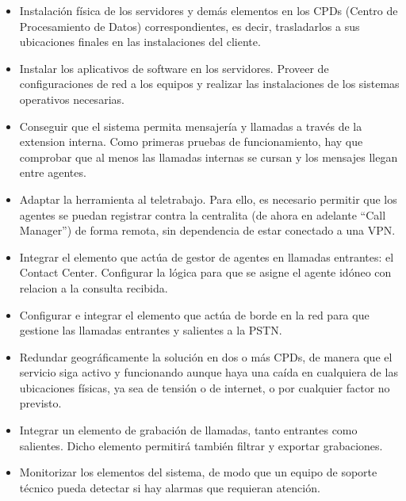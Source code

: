 \documentclass[a4paper, 12pt]{book}
\begin{document}
\begin{itemize}

  \item Instalación física de los servidores y demás elementos en los CPDs (Centro de Procesamiento de Datos) correspondientes, es decir, trasladarlos a sus ubicaciones finales en las instalaciones del cliente.
  
  \item Instalar los aplicativos de software en los servidores. Proveer de configuraciones de red a los equipos y realizar las instalaciones de los sistemas operativos necesarias.

  \item Conseguir que el sistema permita mensajería y llamadas a través de la extension interna. Como primeras pruebas de funcionamiento, hay que comprobar que al menos las llamadas internas se cursan y los mensajes llegan entre agentes.
  
  \item Adaptar la herramienta al teletrabajo. Para ello, es necesario permitir que los agentes se puedan registrar contra la centralita (de ahora en adelante ``Call Manager'') de forma remota, sin dependencia de estar conectado a una VPN.   

  \item Integrar el elemento que actúa de gestor de agentes en llamadas entrantes: el Contact Center. Configurar la lógica para que se asigne el agente idóneo con relacion a la consulta recibida.

  \item Configurar e integrar el elemento que actúa de borde en la red para que gestione las llamadas entrantes y salientes a la PSTN.
  
  \item Redundar geográficamente la solución en dos o más CPDs, de manera que el servicio siga activo y funcionando aunque haya una caída en cualquiera de las ubicaciones físicas, ya sea de tensión o de internet, o por cualquier factor no previsto.

  \item Integrar un elemento de grabación de llamadas, tanto entrantes como salientes. Dicho elemento permitirá también filtrar y exportar grabaciones.
  
  \item Monitorizar los elementos del sistema, de modo que un equipo de soporte técnico pueda detectar si hay alarmas que requieran atención.
\end{itemize}
\end{document}
